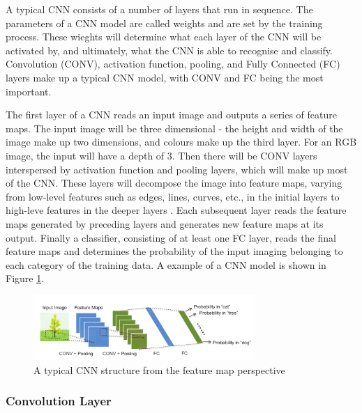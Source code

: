 \documentclass[12pt]{article}
\begin{document}
A typical CNN consists of a number of layers that run in sequence. The parameters of a CNN model are called weights and are set by the training process. These wieghts will determine what each layer of the CNN will be activated by, and ultimately, what the CNN is able to recognise and classify. Convolution (CONV), activation function, pooling, and Fully Connected (FC) layers make up a typical CNN model, with CONV and FC being the most important.

The first layer of a CNN reads an input image and outputs a series of feature maps. The input image will be three dimensional - the height and width of the image make up two dimensions, and colours make up the third layer. For an RGB image, the input will have a depth of 3. Then there will be CONV layers interspersed by activation function and pooling layers, which will make up most of the CNN. These layers will decompose the image into feature maps, varying from low-level features such as edges, lines, curves, etc., in the initial layers to high-leve features in the deeper layers \cite{fpgaCnnAccelerator}. Each subsequent layer reads the feature maps generated by preceding layers and generates new feature maps at its output. Finally a classifier, consisting of at least one FC layer, reads the final feature maps and determines the probability of the input imaging belonging to each category of the training data. A example of a CNN model is shown in Figure \ref{fig:typicalCNN}.
\begin{figure}

\centering
\includegraphics[width=0.75\textwidth]{../figures/typicalCnn}

  \caption{A typical CNN structure from the feature map perspective \cite{embeddedFpgaCnn} \label{fig:typicalCNN}}

\end{figure}

\subsubsection{Convolution Layer}
\label{sec:Background-CNN-Conv}
\vspace{-12pt}
\end{document}
